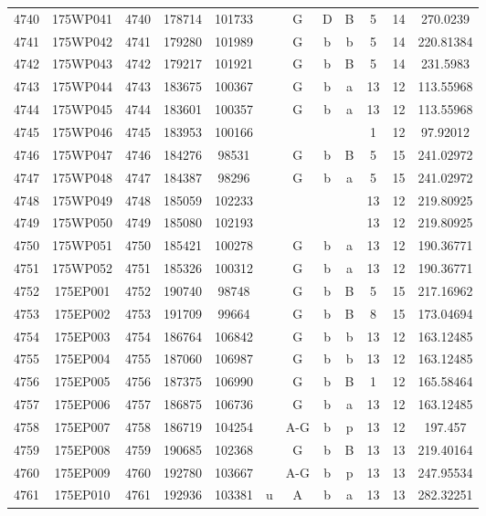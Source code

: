 \begin{tabular}{|*{12}{c|}}
4740 & 175WP041 & 4740 & 178714 & 101733 &  & G & D & B & 5 & 14 & 270.0239 \\ 
4741 & 175WP042 & 4741 & 179280 & 101989 &  & G & b & b & 5 & 14 & 220.81384 \\ 
4742 & 175WP043 & 4742 & 179217 & 101921 &  & G & b & B & 5 & 14 & 231.5983 \\ 
4743 & 175WP044 & 4743 & 183675 & 100367 &  & G & b & a & 13 & 12 & 113.55968 \\ 
4744 & 175WP045 & 4744 & 183601 & 100357 &  & G & b & a & 13 & 12 & 113.55968 \\ 
4745 & 175WP046 & 4745 & 183953 & 100166 &  &  &  &  & 1 & 12 & 97.92012 \\ 
4746 & 175WP047 & 4746 & 184276 & 98531 &  & G & b & B & 5 & 15 & 241.02972 \\ 
4747 & 175WP048 & 4747 & 184387 & 98296 &  & G & b & a & 5 & 15 & 241.02972 \\ 
4748 & 175WP049 & 4748 & 185059 & 102233 &  &  &  &  & 13 & 12 & 219.80925 \\ 
4749 & 175WP050 & 4749 & 185080 & 102193 &  &  &  &  & 13 & 12 & 219.80925 \\ 
4750 & 175WP051 & 4750 & 185421 & 100278 &  & G & b & a & 13 & 12 & 190.36771 \\ 
4751 & 175WP052 & 4751 & 185326 & 100312 &  & G & b & a & 13 & 12 & 190.36771 \\ 
4752 & 175EP001 & 4752 & 190740 & 98748 &  & G & b & B & 5 & 15 & 217.16962 \\ 
4753 & 175EP002 & 4753 & 191709 & 99664 &  & G & b & B & 8 & 15 & 173.04694 \\ 
4754 & 175EP003 & 4754 & 186764 & 106842 &  & G & b & b & 13 & 12 & 163.12485 \\ 
4755 & 175EP004 & 4755 & 187060 & 106987 &  & G & b & b & 13 & 12 & 163.12485 \\ 
4756 & 175EP005 & 4756 & 187375 & 106990 &  & G & b & B & 1 & 12 & 165.58464 \\ 
4757 & 175EP006 & 4757 & 186875 & 106736 &  & G & b & a & 13 & 12 & 163.12485 \\ 
4758 & 175EP007 & 4758 & 186719 & 104254 &  & A-G & b & p & 13 & 12 & 197.457 \\ 
4759 & 175EP008 & 4759 & 190685 & 102368 &  & G & b & B & 13 & 13 & 219.40164 \\ 
4760 & 175EP009 & 4760 & 192780 & 103667 &  & A-G & b & p & 13 & 13 & 247.95534 \\ 
4761 & 175EP010 & 4761 & 192936 & 103381 & u & A & b & a & 13 & 13 & 282.32251 \\ 

\end{tabular}
